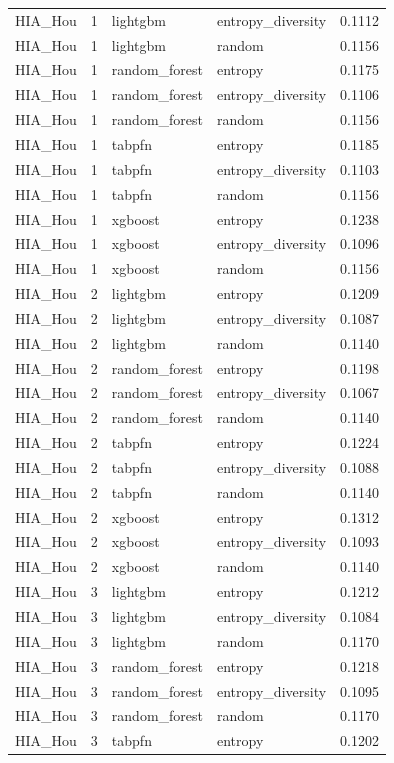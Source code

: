 \begin{tabular}{lrllr}
HIA_Hou & 1 & lightgbm & entropy_diversity & 0.1112 \\
HIA_Hou & 1 & lightgbm & random & 0.1156 \\
HIA_Hou & 1 & random_forest & entropy & 0.1175 \\
HIA_Hou & 1 & random_forest & entropy_diversity & 0.1106 \\
HIA_Hou & 1 & random_forest & random & 0.1156 \\
HIA_Hou & 1 & tabpfn & entropy & 0.1185 \\
HIA_Hou & 1 & tabpfn & entropy_diversity & 0.1103 \\
HIA_Hou & 1 & tabpfn & random & 0.1156 \\
HIA_Hou & 1 & xgboost & entropy & 0.1238 \\
HIA_Hou & 1 & xgboost & entropy_diversity & 0.1096 \\
HIA_Hou & 1 & xgboost & random & 0.1156 \\
HIA_Hou & 2 & lightgbm & entropy & 0.1209 \\
HIA_Hou & 2 & lightgbm & entropy_diversity & 0.1087 \\
HIA_Hou & 2 & lightgbm & random & 0.1140 \\
HIA_Hou & 2 & random_forest & entropy & 0.1198 \\
HIA_Hou & 2 & random_forest & entropy_diversity & 0.1067 \\
HIA_Hou & 2 & random_forest & random & 0.1140 \\
HIA_Hou & 2 & tabpfn & entropy & 0.1224 \\
HIA_Hou & 2 & tabpfn & entropy_diversity & 0.1088 \\
HIA_Hou & 2 & tabpfn & random & 0.1140 \\
HIA_Hou & 2 & xgboost & entropy & 0.1312 \\
HIA_Hou & 2 & xgboost & entropy_diversity & 0.1093 \\
HIA_Hou & 2 & xgboost & random & 0.1140 \\
HIA_Hou & 3 & lightgbm & entropy & 0.1212 \\
HIA_Hou & 3 & lightgbm & entropy_diversity & 0.1084 \\
HIA_Hou & 3 & lightgbm & random & 0.1170 \\
HIA_Hou & 3 & random_forest & entropy & 0.1218 \\
HIA_Hou & 3 & random_forest & entropy_diversity & 0.1095 \\
HIA_Hou & 3 & random_forest & random & 0.1170 \\
HIA_Hou & 3 & tabpfn & entropy & 0.1202 \\

\end{tabular}
